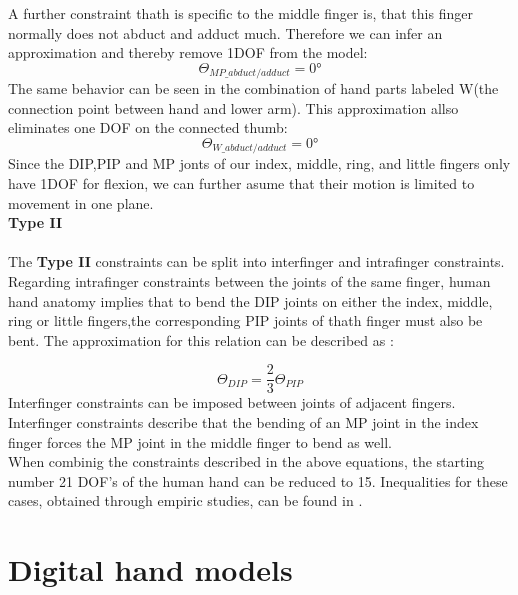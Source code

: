 A further constraint thath is specific to the middle finger is, that this finger normally does not abduct and adduct much. Therefore we can infer an approximation and thereby remove 1DOF from the model:
\begin{equation}
\Theta _{MP\_abduct/adduct}=0°
\end{equation}
The same behavior can be seen in the combination of hand parts labeled W(the connection point between hand and lower arm). This approximation allso eliminates one DOF on the connected thumb:
\begin{equation}
\Theta _{W\_abduct/adduct}=0°
\end{equation}
Since the DIP,PIP and MP jonts of our index, middle, ring, and little fingers only have 1DOF for flexion, we can further asume that their motion is limited to movement in one plane. \\
\textbf{Type II}\\
\\The \textbf{Type II} constraints can be split into interfinger and intrafinger constraints. Regarding intrafinger constraints between the joints of the same finger, human hand anatomy implies that to bend the DIP joints  on  either the index, middle, ring or little fingers,the corresponding PIP joints of thath finger must also be bent. The approximation for this relation can be described as :

\begin{equation}
\Theta _{DIP} =\frac{2}{3}\Theta _{PIP}
\end{equation}
Interfinger constraints can be imposed between joints of adjacent fingers. Interfinger constraints describe that the bending of an MP joint in the index finger forces the MP joint in the middle finger to bend as well.\\
 When combinig the constraints described in the above equations, the starting number 21 DOF's of the human hand can be reduced to 15. Inequalities for these cases, obtained through empiric studies, can be found in \citep{LEE.1995}.\\
\section{Digital hand models}
